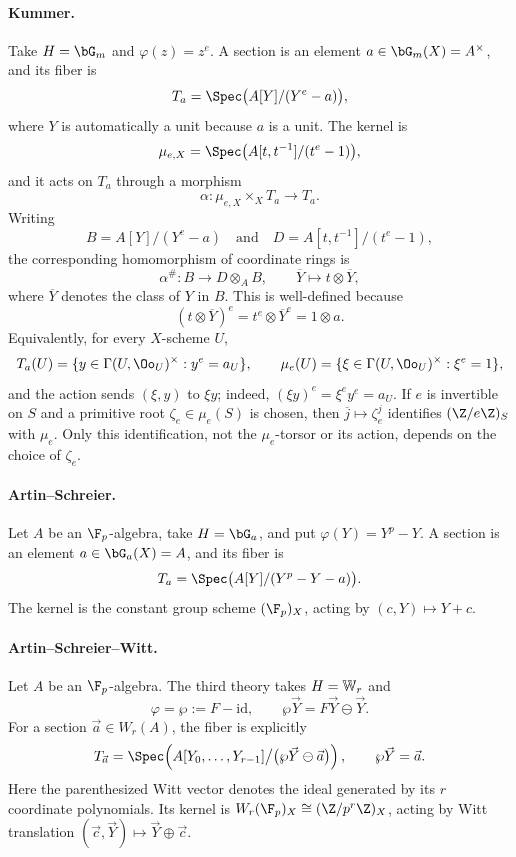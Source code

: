 \paragraph{Kummer.}
Take $H=\bG_m$ and $\varphi(z)=z^e$. A section is an element
$a\in\bG_m(X)=A^\times$, and its fiber is
\[
T_a=\Spec\bigl(A[Y]/(Y^e-a)\bigr),
\]
where $Y$ is automatically a unit because $a$ is a unit. The kernel is
\[
\mu_{e,X}=\Spec\bigl(A[t,t^{-1}]/(t^e-1)\bigr),
\]
and it acts on $T_a$ through a morphism
\[
\alpha:\mu_{e,X}\times_X T_a\longrightarrow T_a.
\]
Writing
\[
B=A[Y]/(Y^e-a)
\quad\text{and}\quad
D=A[t,t^{-1}]/(t^e-1),
\]
the corresponding homomorphism of coordinate rings is
\[
\alpha^\#:B\longrightarrow D\otimes_A B,
\qquad
\overline Y\longmapsto t\otimes\overline Y,
\]
where $\overline Y$ denotes the class of $Y$ in $B$. This is well-defined
because
\[
(t\otimes\overline Y)^e=t^e\otimes\overline Y^e=1\otimes a.
\]
Equivalently, for every $X$-scheme $U$,
\[
T_a(U)=\{y\in\Gamma(U,\Oo_U)^\times:y^e=a_U\},
\qquad
\mu_e(U)=\{\xi\in\Gamma(U,\Oo_U)^\times:\xi^e=1\},
\]
and the action sends $(\xi,y)$ to $\xi y$; indeed,
$(\xi y)^e=\xi^e y^e=a_U$. If $e$ is invertible on $S$ and a primitive
root $\zeta_e\in\mu_e(S)$ is chosen, then
$\overline j\mapsto\zeta_e^j$ identifies $(\Z/e\Z)_S$ with $\mu_e$.
Only this identification, not the $\mu_e$-torsor or its action, depends on
the choice of $\zeta_e$.

\paragraph{Artin--Schreier.}
Let $A$ be an $\F_p$-algebra, take $H=\bG_a$, and put
$\varphi(Y)=Y^p-Y$. A section is an element $a\in\bG_a(X)=A$, and its
fiber is
\[
T_a=\Spec\bigl(A[Y]/(Y^p-Y-a)\bigr).
\]
The kernel is the constant group scheme $(\F_p)_X$, acting by
$(c,Y)\mapsto Y+c$.

\paragraph{Artin--Schreier--Witt.}
Let $A$ be an $\F_p$-algebra. The third theory takes $H=\mathbb{W}_r$ and
\[
\varphi=\wp:=F-\mathrm{id},
\qquad
\wp\vec Y=F\vec Y\ominus\vec Y.
\]
For a section $\vec a\in W_r(A)$, the fiber is explicitly
\[
T_{\vec a}
=\Spec\!\left(
  A[Y_0,\dots,Y_{r-1}]
  \big/\bigl(\wp\vec Y\ominus\vec a\bigr)
\right),
\qquad \wp\vec Y=\vec a.
\]
Here the parenthesized Witt vector denotes the ideal generated by its $r$
coordinate polynomials. Its kernel is
$W_r(\F_p)_X\cong(\Z/p^r\Z)_X$, acting by Witt translation
$(\vec c,\vec Y)\mapsto\vec Y\oplus\vec c$.

